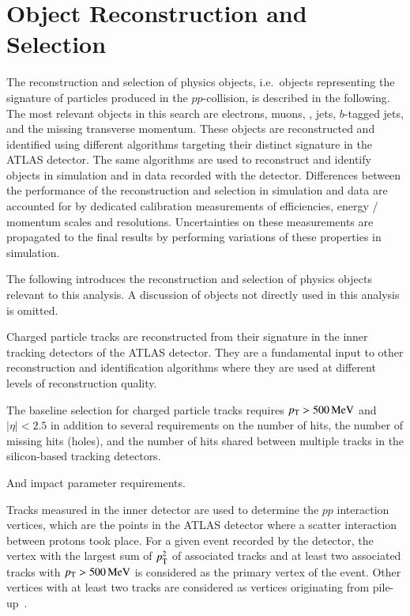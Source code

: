 \section{Object Reconstruction and Selection}
\label{sec:object_reconstruction}

The reconstruction and selection of physics objects, i.e.\ objects
representing the signature of particles produced in the
$pp$-collision, is described in the following. The most relevant
objects in this search are electrons, muons, \tauhadvis, jets,
$b$-tagged jets, and the missing transverse momentum. These objects
are reconstructed and identified using different algorithms targeting
their distinct signature in the ATLAS detector. The same algorithms
are used to reconstruct and identify objects in simulation and in data
recorded with the detector.  Differences between the performance of
the reconstruction and selection in simulation and data are accounted
for by dedicated calibration measurements of efficiencies, energy /
momentum scales and resolutions. Uncertainties on these measurements
are propagated to the final results by performing variations of these
properties in simulation.

The following introduces the reconstruction and selection of physics
objects relevant to this analysis. A discussion of objects not
directly used in this analysis is omitted.




Charged particle tracks are reconstructed from their signature in the
inner tracking detectors of the ATLAS detector. They are a fundamental
input to other reconstruction and identification algorithms where they
are used at different levels of reconstruction quality.

The baseline selection for charged particle tracks requires
$p_{\text{T}} > \SI{500}{\ensuremath{\text{MeV}}}$ and $|\eta| < \num{2.5}$ in addition to several
requirements on the number of hits, the number of missing hits
(holes), and the number of hits shared between multiple tracks in the
silicon-based tracking detectors.

And impact parameter requirements.

\cite{PERF-2015-08}

Tracks measured in the inner detector are used to determine the $pp$
interaction vertices, which are the points in the ATLAS detector where
a scatter interaction between protons took place. For a given event
recorded by the detector, the vertex with the largest sum of $p_{\text{T}}^2$
of associated tracks and at least two associated tracks with
$p_{\text{T}} > \SI{500}{\ensuremath{\text{MeV}}}$ is considered as the primary vertex of the
event. Other vertices with at least two tracks are considered as
vertices originating from pile-up~\cite{PERF-2015-01}.

